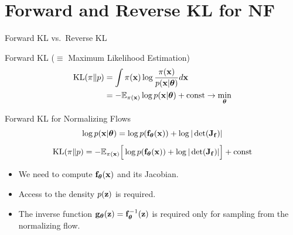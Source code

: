 \documentclass{beamer}
\begin{document}
\section{Forward and Reverse KL for NF}
\begin{frame}{Forward KL vs.\ Reverse KL}
	\begin{block}{Forward KL ($\equiv$ Maximum Likelihood Estimation)}
		\vspace{-0.5cm}
		\begin{align*}
			\mathrm{KL}(\pi \| p) &= \int \pi (\mathbf{x}) \log \frac{\pi(\mathbf{x})}{p(\mathbf{x} | \boldsymbol{\theta})} d \mathbf{x} \\
			&= - \mathbb{E}_{\pi(\mathbf{x})} \log p(\mathbf{x} | \boldsymbol{\theta}) + \text{const} \rightarrow \min_{\boldsymbol{\theta}}
		\end{align*}
	\end{block}
	\begin{block}{Forward KL for Normalizing Flows}
	    \vspace{-0.1cm}
		\[
			\log p(\mathbf{x}|\boldsymbol{\theta}) = \log p(\mathbf{f}_{\boldsymbol{\theta}}(\mathbf{x})) + \log  |\det (\mathbf{J}_{\mathbf{f}})|
		\]		
		\[
			\mathrm{KL}(\pi \| p)  = - \mathbb{E}_{\pi(\mathbf{x})} \Big[\log p(\mathbf{f}_{\boldsymbol{\theta}}(\mathbf{x})) + \log  |\det (\mathbf{J}_{\mathbf{f}})|\Big] + \text{const} 
		\]
		\vspace{-0.2cm}
		\begin{itemize}
			\item We need to compute $\mathbf{f}_{\boldsymbol{\theta}}(\mathbf{x})$ and its Jacobian.
			\item Access to the density $p(\mathbf{z})$ is required.
			\item The inverse function $\mathbf{g}_{\boldsymbol{\theta}}(\mathbf{z}) = \mathbf{f}^{-1}_{\boldsymbol{\theta}}(\mathbf{z})$ is required only for sampling from the normalizing flow.
		\end{itemize}
	\end{block}
\end{frame}
\end{document}

